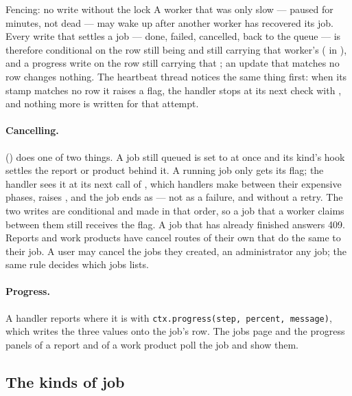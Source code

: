 \begin{codebox}{Fencing: no write without the lock}
A worker that was only slow --- paused for minutes, not dead --- may wake up after another
worker has recovered its job. Every write that settles a job --- done, failed, cancelled,
back to the queue --- is therefore conditional on the row still being  and
still carrying that worker's  ( in ), and
a progress write on the row still carrying that ; an update that matches no
row changes nothing. The heartbeat thread notices the same thing first: when its stamp matches no
row it raises a flag, the handler stops at its next check with , and nothing
more is written for that attempt.
\end{codebox}

\paragraph{Cancelling.}  () does
one of two things. A job still queued is set to  at once and its kind's
 hook settles the report or product behind it. A running job only gets its
 flag; the handler sees it at its next call of
, which handlers make between their expensive phases, raises
, and the job ends as  --- not as a failure, and without a
retry. The two writes are conditional and made in that order, so a job that a worker claims
between them still receives the flag. A job that has already finished answers 409. Reports
and work products have cancel routes of their own that do the same to their job. A user may
cancel the jobs they created, an administrator any job; the same rule decides which jobs
 lists.

\paragraph{Progress.} A handler reports where it is with \texttt{ctx.progress(step, percent, message)}, which writes the three values onto the job's row. The jobs page and the progress
panels of a report and of a work product poll the job and show them.

\subsection{The kinds of job}

